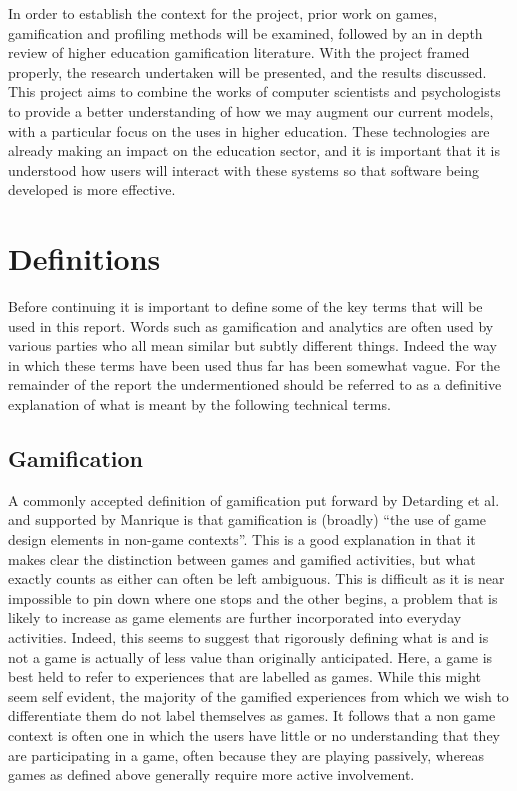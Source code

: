 \documentclass[12pt,a4paper,twoside]{report}
\begin{document}
In order to establish the context for the project, prior work on games, gamification and profiling methods will be examined, followed by an in depth review of higher education gamification literature. With the project framed properly, the research undertaken will be presented, and the results discussed. This project aims to combine the works of computer scientists and psychologists to provide a better understanding of how we may augment our current models, with a particular focus on the uses in higher education. These technologies are already making an impact on the education sector, and it is important that it is understood how users will interact with these systems so that software being developed is more effective.

\chapter{Definitions}
\label{sec:define}
Before continuing it is important to define some of the key terms that will be used in this report. Words such as gamification and analytics are often used by various parties who all mean similar but subtly different things. Indeed the way in which these terms have been used thus far has been somewhat vague. For the remainder of the report the undermentioned should be referred to as a definitive explanation of what is meant by the following technical terms.

\section{Gamification}
A commonly accepted definition of gamification put forward by Detarding et al. \cite{deterding2011game} and supported by Manrique \cite{iversitymooc} is that gamification is (broadly) ``the use of game design elements in non-game contexts''. This is a good explanation in that it makes clear the distinction between games and gamified activities, but what exactly counts as either can often be left ambiguous. This is difficult as it is near impossible to pin down where one stops and the other begins, a problem that is likely to increase as game elements are further incorporated into everyday activities. Indeed, this seems to suggest that rigorously defining what is and is not a game is actually of less value than originally anticipated. Here, a game is best held to refer to experiences that are labelled as games. While this might seem self evident, the majority of the gamified experiences from which we wish to differentiate them do not label themselves as games. It follows that a non game context is often one in which the users have little or no understanding that they are participating in a game, often because they are playing passively, whereas games as defined above generally require more active involvement.
\end{document}
